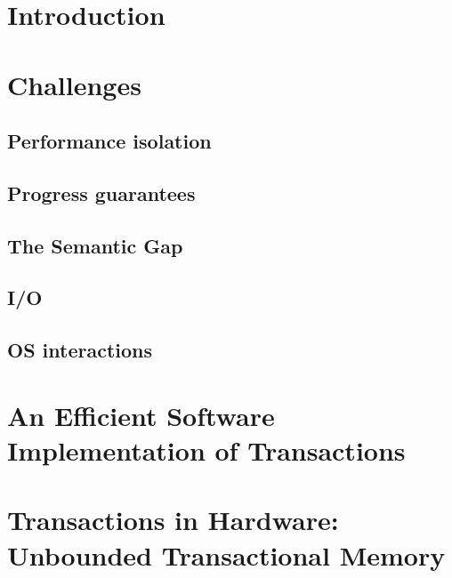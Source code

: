 \documentclass{phd-thesis}
\author{C. Scott Ananian}
\title{\subtitle}
\date{\subdate \\ $ $Revision: 1.12 $ $}
\begin{document}

\frontmatter


\mainmatter
\chapter{Introduction}


\chapter{Challenges}
\section{Performance isolation}
\section{Progress guarantees}\label{sec:progress}
\section{The Semantic Gap}\label{sec:semantic}
\section{I/O}
\section{OS interactions}

\chapter[Efficient Software Implementation]{An Efficient Software Implementation of Transactions}


\chapter[Transactions in Hardware]{Transactions in Hardware: Unbounded Transactional Memory}
\end{document}

